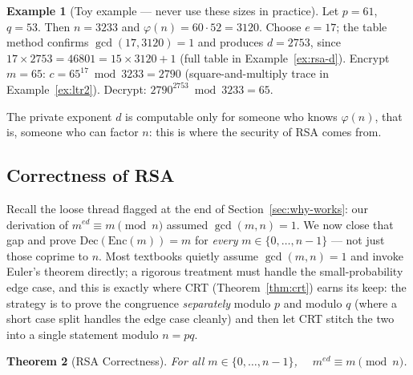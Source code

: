 \documentclass[11pt]{article}
\newtheorem{theorem}{Theorem}[section]
\theoremstyle{definition}
\newtheorem{example}[theorem]{Example}
\theoremstyle{remark}
\begin{document}
\begin{example}[Toy example --- never use these sizes in practice]\label{ex:toy-rsa}
Let $p = 61$, $q = 53$. Then $n = 3233$ and $\varphi(n) = 60 \cdot 52 = 3120$.
Choose $e = 17$; the table method confirms $\gcd(17,3120)=1$ and produces $d = 2753$, since $17 \times 2753 = 46801 = 15 \times 3120 + 1$ (full table in Example~\ref{ex:rsa-d}).
Encrypt $m = 65$: $c = 65^{17} \bmod 3233 = 2790$ (square-and-multiply trace in Example~\ref{ex:ltr2}). Decrypt: $2790^{2753} \bmod 3233 = 65$. \checkmark

The private exponent $d$ is computable only for someone who knows $\varphi(n)$, that is, someone who can factor $n$: this is where the security of RSA comes from.
\end{example}


\subsection{Correctness of RSA}\label{sec:correctness}

Recall the loose thread flagged at the end of Section~\ref{sec:why-works}: our derivation of $m^{ed}\equiv m\pmod n$ assumed $\gcd(m,n)=1$. We now close that gap and prove $\mathrm{Dec}(\mathrm{Enc}(m)) = m$ for \emph{every} $m \in \{0, \dots, n-1\}$ — not just those coprime to $n$. Most textbooks quietly assume $\gcd(m,n)=1$ and invoke Euler's theorem directly; a rigorous treatment must handle the small-probability edge case, and this is exactly where CRT (Theorem~\ref{thm:crt}) earns its keep: the strategy is to prove the congruence \emph{separately} modulo $p$ and modulo $q$ (where a short case split handles the edge case cleanly) and then let CRT stitch the two into a single statement modulo $n=pq$.

\begin{theorem}[RSA Correctness]\label{thm:rsa-correct}
For all $m \in \{0, \dots, n-1\}$, $\quad m^{ed} \equiv m \pmod n$.
\end{theorem}
\end{document}
